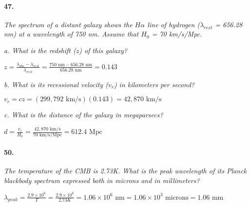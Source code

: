 \documentclass[letterpaper,11pt]{article}
\begin{document}
\paragraph{47.}
\it
The spectrum of a distant galaxy shows the $H\alpha$ line of hydrogen ($\lambda_{rest}$ = 656.28 nm) at a wavelength of 750 nm. Assume that $H_0$ = 70 km/s/Mpc.
\smallskip
\par
\it
a. What is the redshift ($z$) of this galaxy?
\smallskip
	\par
	\normalfont
	\begin{center}
		$
		\displaystyle
		z
		=
		\frac{\lambda_{obs}-\lambda_{rest}}{\lambda_{rest}}
		=
		\frac{750 \textrm{ nm} - 656.28 \textrm{ nm}}{656.28 \textrm{ nm}}
		=
		0.143
		$
	\end{center}
	\smallskip
\par
\it
b. What is its recessional velocity ($v_r$) in kilometers per second?
\smallskip
	\par
	\normalfont
	\begin{center}
		$
		\displaystyle
		v_r
		=
		cz
		=
		(299,792 \textrm{ km/s})(0.143)
		=
		42,870 \textrm{ km/s}
		$
	\end{center}
	\smallskip
\par
\it
c. What is the distance of the galaxy in megaparsecs?
\smallskip
	\par
	\normalfont
	\begin{center}
		$
		\displaystyle
		d
		=
		\frac{v_r}{H_0}
		=
		\frac{42,870 \textrm{ km/s}}{70 \textrm{ km/s/Mpc}}
		=
		612.4 \textrm{ Mpc}
		$
	\end{center}



\paragraph{50.}
\it
The temperature of the CMB is 2.73K. What is the peak wavelength of its Planck blackbody spectrum expressed both in microns and in millimeters?
\smallskip
	\par
	\normalfont
	\begin{center}
		$
		\displaystyle
		\lambda_{peak}
		=
		\frac{2.9\times10^6}{T}
		=
		\frac{2.9\times10^6}{2.73K}
		=
		1.06\times10^6 \textrm{ nm}
		=
		1.06\times10^3 \textrm{ microns}
		=
		1.06 \textrm{ mm}
		$
	\end{center}
	
\end{document}
